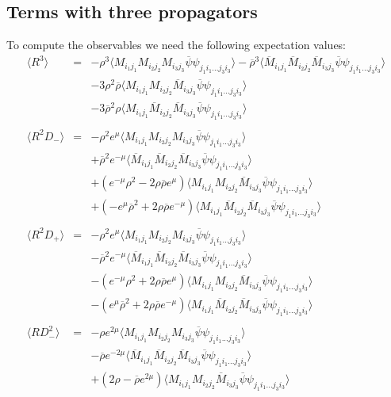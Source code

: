 \documentclass[a4paper,10pt]{report}
\newcommand{\ol}[1]{\overline{#1}}
\newcommand{\rrb}{\overline{\rho}}
\newcommand{\rr}{\rho}
\newcommand{\emu}{e^{\mu}}
\newcommand{\emmu}{e^{-\mu}}
\newcommand{\Mb}{\ol{M}}
\newcommand{\mv}[1]{\langle #1 \rangle}
\newcommand{\ppb}{\ol{\psi}\psi}
\begin{document}
\newpage
\subsection*{Terms with three propagators}

To compute the observables we need the following expectation values:
\begin{eqnarray}
\mv{R^3} &=& -\rr^3  \mv{M_{i_1j_1}M_{i_2j_2}M_{i_3j_3} \ppb_{j_1i_1...j_3i_3}}
           -  \rrb^3 \mv{\Mb_{i_1j_1}\Mb_{i_2j_2}\Mb_{i_3j_3} \ppb_{j_1i_1...j_3i_3}} \nonumber\\
          && - 3 \rr^2\rrb \mv{M_{i_1j_1}M_{i_2j_2}\Mb_{i_3j_3} \ppb_{j_1i_1...j_3i_3}} \nonumber\\
          && - 3 \rrb^2\rr \mv{M_{i_1j_1}\Mb_{i_2j_2}\Mb_{i_3j_3} \ppb_{j_1i_1...j_3i_3}}    \\
\nonumber\\
\mv{R^2D_-} &=& -\rr^2\emu  \mv{M_{i_1j_1}M_{i_2j_2}M_{i_3j_3} \ppb_{j_1i_1...j_3i_3}}\nonumber\\
          && +  \rrb^2\emmu \mv{\Mb_{i_1j_1}\Mb_{i_2j_2}\Mb_{i_3j_3} \ppb_{j_1i_1...j_3i_3}} \nonumber\\
          && + (\emmu\rr^2 - 2 \rr\rrb\emu) \mv{M_{i_1j_1}M_{i_2j_2}\Mb_{i_3j_3} \ppb_{j_1i_1...j_3i_3}} \nonumber\\
          && + (-\emu\rrb^2 + 2 \rr\rrb\emmu) \mv{M_{i_1j_1}\Mb_{i_2j_2}\Mb_{i_3j_3} \ppb_{j_1i_1...j_3i_3}}    \\
\nonumber\\
\mv{R^2D_+} &=& -\rr^2\emu  \mv{M_{i_1j_1}M_{i_2j_2}M_{i_3j_3} \ppb_{j_1i_1...j_3i_3}}\nonumber\\
          && -  \rrb^2\emmu \mv{\Mb_{i_1j_1}\Mb_{i_2j_2}\Mb_{i_3j_3} \ppb_{j_1i_1...j_3i_3}} \nonumber\\
          && - (\emmu\rr^2 + 2 \rr\rrb\emu) \mv{M_{i_1j_1}M_{i_2j_2}\Mb_{i_3j_3} \ppb_{j_1i_1...j_3i_3}} \nonumber\\
          && - (\emu\rrb^2 + 2 \rr\rrb\emmu) \mv{M_{i_1j_1}\Mb_{i_2j_2}\Mb_{i_3j_3} \ppb_{j_1i_1...j_3i_3}} \\
\nonumber\\
\mv{RD_-^2} &=& -\rr e^{2\mu}  \mv{M_{i_1j_1}M_{i_2j_2}M_{i_3j_3} \ppb_{j_1i_1...j_3i_3}}\nonumber\\
          && -  \rrb e^{-2\mu} \mv{\Mb_{i_1j_1}\Mb_{i_2j_2}\Mb_{i_3j_3} \ppb_{j_1i_1...j_3i_3}} \nonumber\\
          && + (2\rr-\rrb e^{2\mu}) \mv{M_{i_1j_1}M_{i_2j_2}\Mb_{i_3j_3} \ppb_{j_1i_1...j_3i_3}} \nonumber\\

\end{eqnarray}
\end{document}
